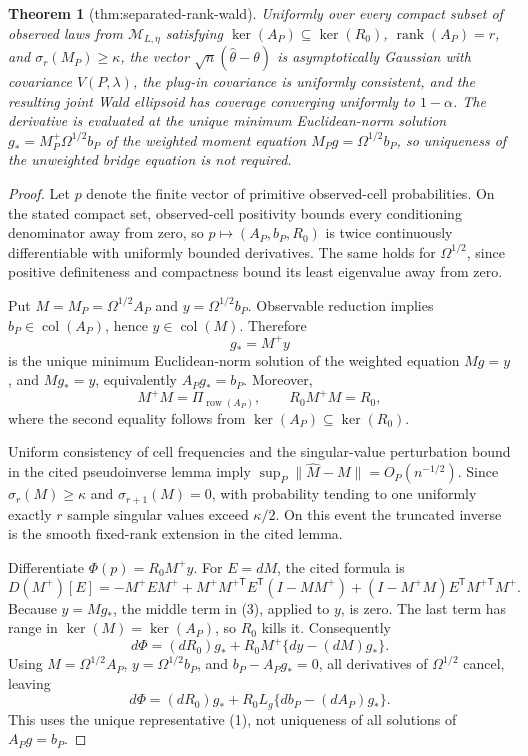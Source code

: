 \documentclass{article}
\newtheorem{theorem}{Theorem}
\begin{document}
\begin{theorem}[thm:separated-rank-wald]\label{thm:separated-rank-wald}
Uniformly over every compact subset of observed laws from \(\mathcal M_{L,\eta}\) satisfying \(\ker(A_P)\subseteq\ker(R_0)\), \(\operatorname{rank}(A_P)=r\), and \(\sigma_r(M_P)\ge\kappa\), the vector \(\sqrt n(\widehat\theta-\theta)\) is asymptotically Gaussian with covariance \(V(P,\lambda)\), the plug-in covariance is uniformly consistent, and the resulting joint Wald ellipsoid has coverage converging uniformly to \(1-\alpha\).  The derivative is evaluated at the unique minimum Euclidean-norm solution \(g_*=M_P^+\Omega^{1/2}b_P\) of the weighted moment equation \(M_Pg=\Omega^{1/2}b_P\), so uniqueness of the unweighted bridge equation is not required.
\end{theorem}
\begin{proof}
Let \(p\) denote the finite vector of primitive observed-cell probabilities.  On the stated compact set, observed-cell positivity bounds every conditioning denominator away from zero, so \(p\mapsto(A_P,b_P,R_0)\) is twice continuously differentiable with uniformly bounded derivatives.  The same holds for \(\Omega^{1/2}\), since positive definiteness and compactness bound its least eigenvalue away from zero.

Put \(M=M_P=\Omega^{1/2}A_P\) and \(y=\Omega^{1/2}b_P\).  Observable reduction implies \(b_P\in\operatorname{col}(A_P)\), hence \(y\in\operatorname{col}(M)\).  Therefore
\[
g_*=M^+y
\tag{1}
\]
is the unique minimum Euclidean-norm solution of the weighted equation \(Mg=y\), and \(Mg_*=y\), equivalently \(A_Pg_*=b_P\).  Moreover,
\[
M^+M=\Pi_{\operatorname{row}(A_P)},
\qquad R_0M^+M=R_0,
\tag{2}
\]
where the second equality follows from \(\ker(A_P)\subseteq\ker(R_0)\).

Uniform consistency of cell frequencies and the singular-value perturbation bound in the cited pseudoinverse lemma imply \(\sup_P\|\widehat M-M\|=O_P(n^{-1/2})\).  Since \(\sigma_r(M)\ge\kappa\) and \(\sigma_{r+1}(M)=0\), with probability tending to one uniformly exactly \(r\) sample singular values exceed \(\kappa/2\).  On this event the truncated inverse is the smooth fixed-rank extension in the cited lemma.

Differentiate \(\Phi(p)=R_0M^+y\).  For \(E=dM\), the cited formula is
\[
D(M^+)[E]=-M^+EM^++M^+M^{+\mathsf T}E^{\mathsf T}(I-MM^+)
+(I-M^+M)E^{\mathsf T}M^{+\mathsf T}M^+.
\tag{3}
\]
Because \(y=Mg_*\), the middle term in (3), applied to \(y\), is zero.  The last term has range in \(\ker(M)=\ker(A_P)\), so \(R_0\) kills it.  Consequently
\[
d\Phi=(dR_0)g_*+R_0M^+\{dy-(dM)g_*\}.
\]
Using \(M=\Omega^{1/2}A_P\), \(y=\Omega^{1/2}b_P\), and \(b_P-A_Pg_*=0\), all derivatives of \(\Omega^{1/2}\) cancel, leaving
\[
d\Phi=(dR_0)g_*+R_0L_g\{db_P-(dA_P)g_*\}.
\tag{4}
\]
This uses the unique representative (1), not uniqueness of all solutions of \(A_Pg=b_P\).


\end{proof}
\end{document}
